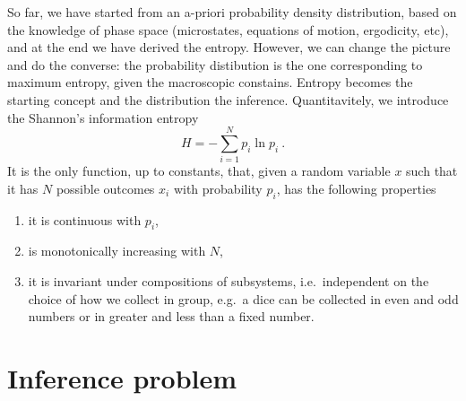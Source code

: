     So far, we have started from an a-priori probability density distribution, based on the knowledge of phase space (microstates, equations of motion, ergodicity, etc), and at the end we have derived the entropy. However, we can change the picture and do the converse: the probability distibution is the one corresponding to maximum entropy, given the macroscopic constains. Entropy becomes the starting concept and the distribution the inference. Quantitavitely, we introduce the Shannon's information entropy
    \begin{equation}\label{e:shannon}
        H = - \sum_{i = 1}^{N} p_i \ln p_i ~.
    \end{equation}
    It is the only function, up to constants, that, given a random variable $x$ such that it has $N$ possible outcomes $x_i$ with probability $p_i$, has the following properties
    \begin{enumerate}
        \item it is continuous with $p_i$,
        \item is monotonically increasing with $N$,
        \item it is invariant under compositions of subsystems, i.e.~independent on the choice of how we collect in group, e.g.~a dice can be collected in even and odd numbers or in greater and less than a fixed number.
    \end{enumerate}

\section{Inference problem}

